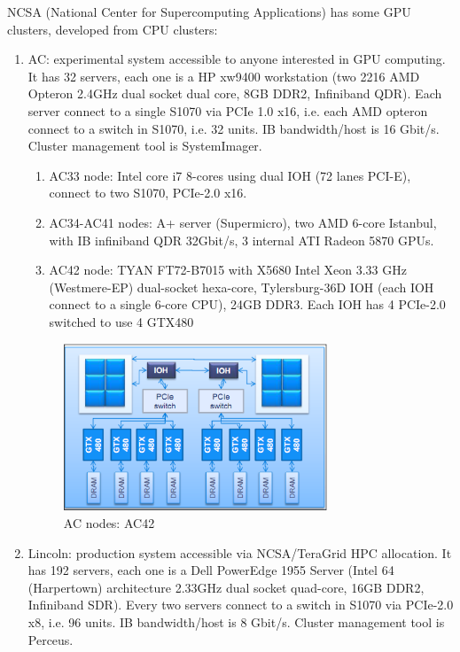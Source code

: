 NCSA (National Center for Supercomputing Applications) has some GPU clusters,
developed from CPU clusters:
\begin{enumerate}
  \item AC: experimental system accessible to anyone interested in GPU
  computing. It has 32 servers, each one is a HP xw9400 workstation (two 2216
  AMD Opteron 2.4GHz dual socket dual core, 8GB DDR2, Infiniband QDR). Each server
  connect to a single S1070 via PCIe 1.0 x16, i.e. each AMD opteron connect to a
  switch in S1070, i.e. 32 units. IB bandwidth/host is 16 Gbit/s. Cluster
  management tool is SystemImager.
  \begin{enumerate}
    \item AC33 node: Intel core i7 8-cores using dual IOH (72 lanes PCI-E),
    connect to two S1070, PCIe-2.0 x16.
    \item AC34-AC41 nodes: A+ server (Supermicro), two AMD 6-core Istanbul, with
    IB infiniband QDR 32Gbit/s, 3 internal ATI Radeon 5870 GPUs.
    \item AC42 node: TYAN FT72-B7015 with X5680 Intel Xeon 3.33 
GHz (Westmere-EP) dual-socket hexa-core, Tylersburg-36D IOH (each IOH connect
to a single 6-core CPU), 24GB DDR3. Each IOH has 4 PCIe-2.0 switched to use 4
GTX480
  \end{enumerate}
    
\begin{figure}[hbt]
  \centerline{\includegraphics[height=5cm,
    angle=0]{./images/AC42_node.eps}}
\caption{AC nodes: AC42}
\label{fig:Lincoln_node.AC_node}
\end{figure}
  
  \item Lincoln: production system accessible via NCSA/TeraGrid HPC allocation.
  It has 192 servers, each one is a Dell PowerEdge 1955 Server (Intel 64
  (Harpertown) architecture 2.33GHz dual socket quad-core, 16GB DDR2, Infiniband
  SDR). Every two servers connect to a switch in S1070 via PCIe-2.0 x8, i.e. 96
  units. IB bandwidth/host is 8 Gbit/s. Cluster
  management tool is Perceus.


\end{enumerate}
